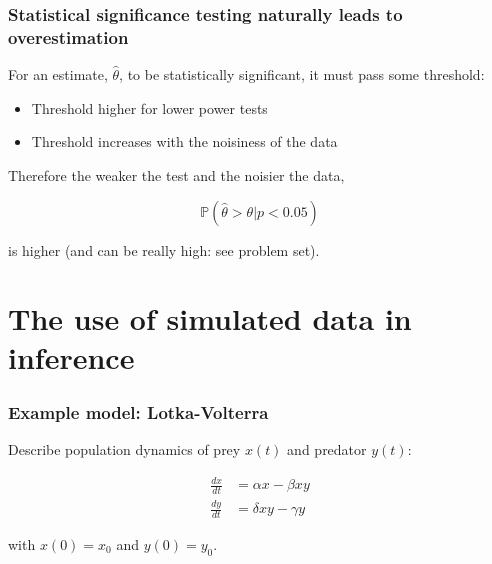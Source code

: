 \documentclass[handout]{beamer}
\begin{document}
\begin{frame}
	\frametitle{Statistical significance testing naturally leads to overestimation}
	
	For an estimate, $\hat{\theta}$, to be statistically significant, it must pass some threshold:
	
	\begin{itemize}
		\item Threshold higher for lower power tests
		\item Threshold increases with the noisiness of the data
	\end{itemize}
	
	Therefore the weaker the test and the noisier the data,
	
	\begin{equation}
	\mathbb{P}(\hat{\theta} > \theta|p < 0.05)
	\end{equation}
	
	is higher (and can be really high: see problem set).
	
\end{frame}

\section{The use of simulated data in inference}
\frame{\tableofcontents[currentsection]}

\begin{frame}
	\frametitle{Example model: Lotka-Volterra}
	
	Describe population dynamics of prey $x(t)$ and predator $y(t)$:
	
	\begin{align}
	\frac{dx}{dt} &= \alpha x - \beta x y\\
	\frac{dy}{dt} &= \delta x y - \gamma y
	\end{align}
	
	with $x(0)=x_0$ and $y(0)=y_0$.
	
\end{frame}
\end{document}
